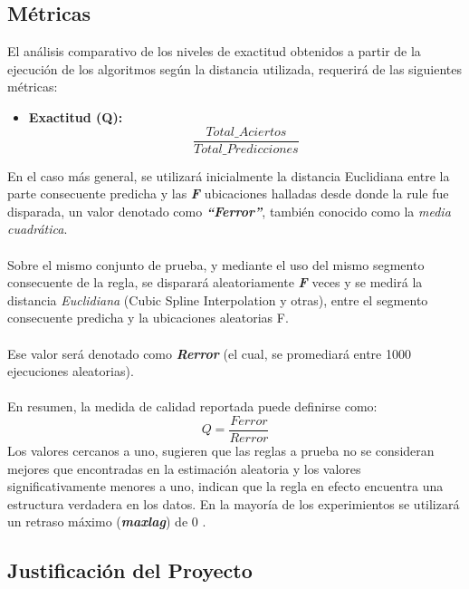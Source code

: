 \subsection{M\'etricas}
El an\'alisis comparativo de los niveles de exactitud obtenidos a partir de la ejecuci\'on de los algoritmos seg\'un la distancia utilizada, requerir\'a de las siguientes m\'etricas:
\begin{itemize}
\item \textbf{Exactitud (Q):}
\begin{equation}
 \frac{Total\_Aciertos} {Total\_Predicciones}
\end{equation}
\end{itemize}
En el caso m\'as general, se utilizar\'a inicialmente la distancia Euclidiana entre la parte consecuente predicha y las \textit{\textbf{F}} ubicaciones halladas desde donde la rule fue disparada, un valor denotado como \textit{\textbf{\enquote{Ferror}}}, tambi\'en conocido como la \textit{media cuadr\'atica}.\\\\
Sobre el mismo conjunto de prueba, y mediante el uso del mismo segmento consecuente de la regla, se disparar\'a aleatoriamente \textit{\textbf{F}} veces y se medir\'a la distancia \textit{Euclidiana} (Cubic Spline Interpolation y otras), entre el segmento consecuente predicha y la ubicaciones aleatorias F.\\\\
Ese valor ser\'a denotado como \textit{\textbf{Rerror}} (el cual, se promediar\'a entre 1000 ejecuciones aleatorias).\\\\
En resumen, la medida de calidad reportada puede definirse como: 
\begin{equation} 
Q = \frac{Ferror}{Rerror} 
\end{equation}
Los valores cercanos a uno, sugieren que las reglas a prueba no se consideran mejores que encontradas en la estimaci\'on aleatoria y los valores significativamente menores a uno, indican que la regla en efecto encuentra una estructura verdadera en los datos. En la mayor\'ia de los experimientos se utilizar\'a un retraso m\'aximo (\textit{\textbf{maxlag}}) de 0 .
\subsection{Justificaci\'on del Proyecto}
